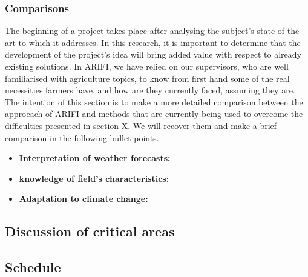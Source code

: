 \subsubsection{Comparisons}	
The beginning of a project takes place after analysing the subject's state of the art to which it addresses. In this research, it is important to determine that the development of the project's idea will bring added value with respect to already existing solutions. In ARIFI, we have relied on our supervisors, who are well familiarised with agriculture topics, to know from first hand some of the real necessities farmers have, and how are they currently faced, assuming they are. The intention of this section is to make a more detailed comparison between the approeach of ARIFI and methods that are currently being used to overcome the difficulties presented in section X. We will recover them and make a brief comparison in the following bullet-points. 
\begin{itemize}
    \item \textbf{Interpretation of weather forecasts:} 
    \item \textbf{knowledge of field's characteristics:} 
    \item \textbf{Adaptation to climate change:} 
\end{itemize}

\subsection{Discussion of critical areas}
\subsection{Schedule}
